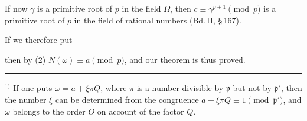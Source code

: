 If now $\gamma$ is a primitive root of $p$ in the field $\Omega$, then $c \equiv \gamma^{p+1} \pmod{p}$ is a primitive root of $p$ in the field of rational numbers (Bd.\,II, \S\,167).

If we therefore put


then by (2) $N(\omega) \equiv a \pmod{p}$, and our theorem is thus proved.

\par\noindent\rule{0.25\linewidth}{0.4pt}\par
\begingroup\footnotesize
$^{1)}$ If one puts $\omega = a + \xi \pi Q$, where $\pi$ is a number divisible by $\mathfrak{p}$ but not by $\mathfrak{p}'$, then the number $\xi$ can be determined from the congruence $a + \xi \pi Q \equiv 1 \pmod{\mathfrak{p}'}$, and $\omega$ belongs to the order $O$ on account of the factor $Q$.
\endgroup

